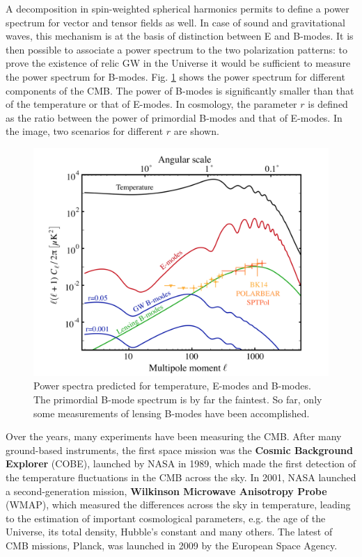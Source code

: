 \documentclass[12pt,a4paper,final]{book}			%
\begin{document}
			A decomposition in spin-weighted spherical harmonics permits to define a power spectrum for vector and tensor fields as well.
			In case of sound and gravitational waves, this mechanism is at the basis of distinction between E and B-modes. It is then possible to associate a power spectrum to the two polarization patterns: to prove the existence of relic GW in the Universe it would be sufficient to measure the power spectrum for B-modes. Fig. \ref{fig:Tomasi_power_spectrum} shows the power spectrum for different components of the CMB. The power of B-modes is significantly smaller than that of the temperature or that of E-modes. In cosmology, the parameter $r$ is defined as the ratio between the power of primordial B-modes and that of E-modes. In the image, two scenarios for different $r$ are shown.

			 \begin{figure}[h!]
			 	\centering
			 	\includegraphics[scale=0.5]{figures/power_spectrum.png}
			 	\caption{Power spectra predicted for temperature, E-modes and B-modes. The primordial B-mode spectrum is by far the faintest. So far, only some measurements of lensing B-modes have been accomplished. \cite{Libro_CMB}}
			 	\label{fig:Tomasi_power_spectrum}
			 \end{figure}
			 
			 Over the years, many experiments have been measuring the CMB. After many ground-based instruments, the first space mission was the \textbf{Cosmic Background Explorer} (COBE), launched by NASA in 1989, which made the first detection of the temperature fluctuations in the CMB across the sky. In 2001, NASA launched a second-generation mission, \textbf{Wilkinson Microwave Anisotropy Probe} (WMAP), which measured the differences across the sky in temperature, leading to the estimation of important cosmological parameters, e.g. the age of the Universe, its total density, Hubble's constant and many others.\cite{WMAP} The latest of CMB missions, Planck, was launched in 2009 by the European Space Agency. 
			 
\end{document}
